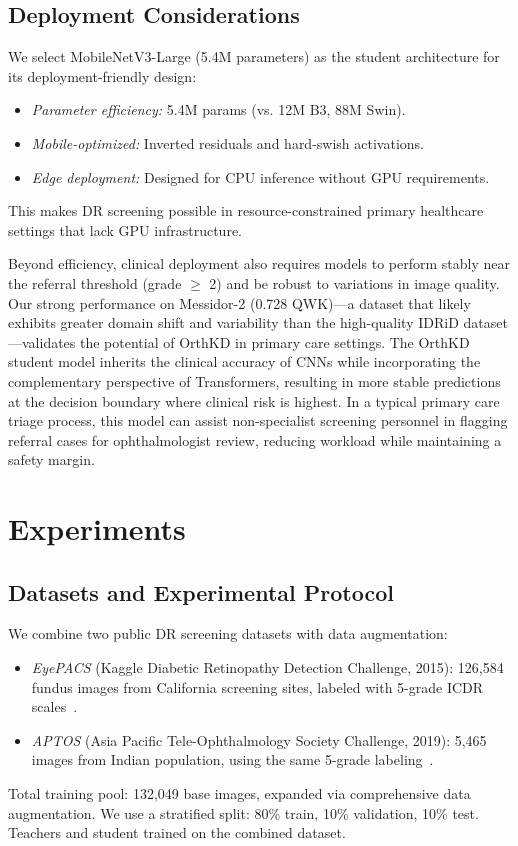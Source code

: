 \documentclass{article}
\begin{document}
\subsection{Deployment Considerations}
We select MobileNetV3-Large (5.4M parameters) as the student architecture for its deployment-friendly design:
\begin{itemize}[leftmargin=*,itemsep=2pt]
\item \textit{Parameter efficiency:} 5.4M params (vs. 12M B3, 88M Swin).
\item \textit{Mobile-optimized:} Inverted residuals and hard-swish activations.
\item \textit{Edge deployment:} Designed for CPU inference without GPU requirements.
\end{itemize}
This makes DR screening possible in resource-constrained primary healthcare settings that lack GPU infrastructure.

Beyond efficiency, clinical deployment also requires models to perform stably near the referral threshold (grade $\geq$ 2) and be robust to variations in image quality. Our strong performance on Messidor-2 (0.728 QWK)—a dataset that likely exhibits greater domain shift and variability than the high-quality IDRiD dataset—validates the potential of OrthKD in primary care settings. The OrthKD student model inherits the clinical accuracy of CNNs while incorporating the complementary perspective of Transformers, resulting in more stable predictions at the decision boundary where clinical risk is highest. In a typical primary care triage process, this model can assist non-specialist screening personnel in flagging referral cases for ophthalmologist review, reducing workload while maintaining a safety margin.
\section{Experiments}

\subsection{Datasets and Experimental Protocol}
We combine two public DR screening datasets with data augmentation:
\begin{itemize}[leftmargin=*,itemsep=1pt,topsep=1pt]
    \item \textit{EyePACS} (Kaggle Diabetic Retinopathy Detection Challenge, 2015): 126,584 fundus images from California screening sites, labeled with 5-grade ICDR scales~\cite{wilkinson2003proposed}.
    \item \textit{APTOS} (Asia Pacific Tele-Ophthalmology Society Challenge, 2019): 5,465 images from Indian population, using the same 5-grade labeling~\cite{aptos2019}.
\end{itemize}
Total training pool: 132,049 base images, expanded via comprehensive data augmentation. We use a stratified split: 80\% train, 10\% validation, 10\% test. Teachers and student trained on the combined dataset.
\end{document}
